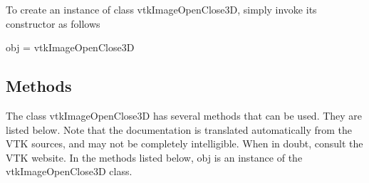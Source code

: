 To create an instance of class vtk\-Image\-Open\-Close3\-D, simply invoke its constructor as follows \begin{DoxyVerb}  obj = vtkImageOpenClose3D
\end{DoxyVerb}
 \hypertarget{vtkwidgets_vtkxyplotwidget_Methods}{}\subsection{Methods}\label{vtkwidgets_vtkxyplotwidget_Methods}
The class vtk\-Image\-Open\-Close3\-D has several methods that can be used. They are listed below. Note that the documentation is translated automatically from the V\-T\-K sources, and may not be completely intelligible. When in doubt, consult the V\-T\-K website. In the methods listed below, {\ttfamily obj} is an instance of the vtk\-Image\-Open\-Close3\-D class. 
